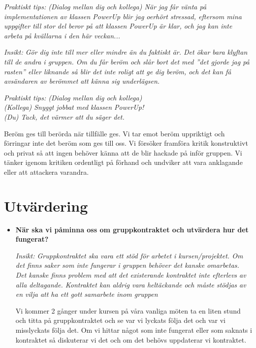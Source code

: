 \documentclass{mall}
\begin{document}
\begin{itemize}
  \emph{Praktiskt tips: (Dialog mellan dig och kollega) När jag får vänta på implementationen av klassen PowerUp blir jag oerhört stressad, eftersom mina uppgifter till stor del beror på att klassen PowerUp är klar, och jag kan inte arbeta på kvällarna i den här veckan...}

  \emph{Insikt: Gör dig inte till mer eller mindre än du faktiskt är. Det ökar bara klyftan till de andra i gruppen. Om du får beröm och slår bort det med ''det gjorde jag på rasten'' eller liknande så blir det inte roligt att ge dig beröm, och det kan få avsändaren av berömmet att känna sig underlägsen.}
  
  \emph{Praktiskt tips: (Dialog mellan dig och kollega) \\
    (Kollega) Snyggt jobbat med klassen PowerUp!\\
    (Du) Tack, det värmer att du säger det.
  }

  Beröm ges till berörda när tillfälle ges. Vi tar emot beröm uppriktigt och förringar inte det beröm
  som ges till oss. Vi försöker framföra kritik konstruktivt och privat så att ingen behöver känna att
  de blir hackade på inför gruppen. Vi tänker igenom kritiken ordentligt på förhand och undviker att vara
  anklagande eller att attackera varandra.

\end{itemize}

\section{Utvärdering}

\begin{itemize}
\item \textbf{När ska vi påminna oss om gruppkontraktet och utvärdera hur det fungerat?}

  \emph{Insikt: Gruppkontraktet ska vara ett stöd för arbetet i kursen/projektet. Om det finns saker som
    inte fungerar i gruppen behöver det kanske omarbetas. Det kanske finns problem med att det existerande
    kontraktet inte efterlevs av alla deltagande. Kontraktet kan aldrig vara heltäckande och måste stödjas
    av en vilja att ha ett gott samarbete inom gruppen}
  
  Vi kommer 2 gånger under kursen på våra vanliga möten ta en liten stund och titta på gruppkontraktet
  och se var vi lyckats följa det och var vi misslyckats följa det. Om vi hittar något som inte fungerat
  eller som saknats i kontraktet så diskuterar vi det och om det behövs uppdaterar vi kontraktet.


\end{itemize}
\end{document}

